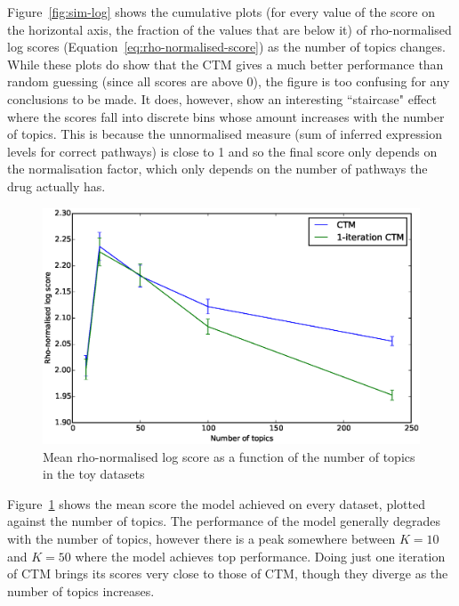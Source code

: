 \documentclass[12pt,a4paper,twoside,openright]{report}
\begin{document}
Figure~\ref{fig:sim-log} shows the cumulative plots (for every value of the score on the horizontal axis, the fraction of the values that are below it) of rho-normalised log scores (Equation~\ref{eq:rho-normalised-score}) as the number of topics changes. While these plots do show that the CTM gives a much better performance than random guessing (since all scores are above 0), the figure is too confusing for any conclusions to be made. It does, however, show an interesting ``staircase" effect where the scores fall into discrete bins whose amount increases with the number of topics. This is because the unnormalised measure (sum of inferred expression levels for correct pathways) is close to 1 and so the final score only depends on the normalisation factor, which only depends on the number of pathways the drug actually has.

\begin{figure}[!htb]
\includegraphics[width=\textwidth]{sim-average-rho.eps}
\caption{Mean rho-normalised log score as a function of the number of topics in the toy datasets}
\label{fig:sim-average-rho}
\end{figure}

Figure~\ref{fig:sim-average-rho} shows the mean score the model achieved on every dataset, plotted against the number of topics. The performance of the model generally degrades with the number of topics, however there is a peak somewhere between $K=10$ and $K=50$ where the model achieves top performance. Doing just one iteration of CTM brings its scores very close to those of CTM, though they diverge as the number of topics increases.
\end{document}
